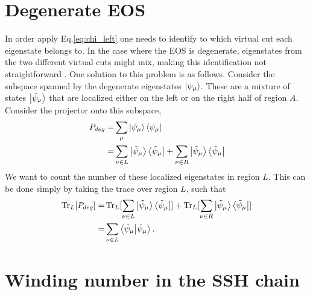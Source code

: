 \documentclass[twocolumn,amsmath,longbibliography,amssymb,superscriptaddress]{revtex4-1}
\begin{document}
\section{Degenerate EOS}\label{app:loc}

In order apply Eq.\eqref{eq:chi_left} one needs to identify to which virtual cut each eigenstate belongs to. In the case where the EOS is degenerate, eigenstates from the two different virtual cuts might mix, making this identification not straightforward . One solution to this problem is as follows. Consider the subspace spanned by the degenerate eigenstates $\ket{\psi_\mu}$. These are a mixture of states $\ket{\tilde{\psi}_\nu}$ that are localized either on the left or on the right half of region $A$. Consider the projector onto this subspace,
\begin{align}
P_{deg} =& \sum_\mu \ket{\psi_\mu}\bra{\psi_{\mu}} \nonumber \\
=&  \sum_{\nu \in L} \ket{\tilde{\psi}_\mu}\bra{\tilde{\psi}_{\mu}}+ \sum_{\nu \in R} \ket{\tilde{\psi}_\mu}\bra{\tilde{\psi}_{\mu}} 
\end{align}
We want to count the number of these localized eigenstates in region $L$. This can be done simply by taking the trace over region $L$, such that
\begin{align}
\Tr_L [P_{deg} ]=&  \Tr_L[ \sum_{\nu \in L} \ket{\tilde{\psi}_\mu}\bra{\tilde{\psi}_{\mu}}]+ \Tr_L[ \sum_{\nu \in R} \ket{\tilde{\psi}_\mu}\bra{\tilde{\psi}_{\mu}} ] \\
=&  \sum_{\nu \in L} \bra{\tilde{\psi}_{\mu}} \ket{\tilde{\psi}_\mu} .
\end{align}
\section{Winding number in the SSH chain}
\label{appendix:winding_ssh}
\end{document}
